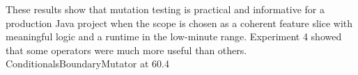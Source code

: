 \documentclass[11pt]{article}
\begin{document}
These results show that mutation testing is practical and informative for a production Java project when the scope is chosen as a coherent feature slice with meaningful logic and a runtime in the low-minute range. Experiment 4 showed that some operators were much more useful than others. ConditionalsBoundaryMutator at 60.4%


\appendix
\end{document}
